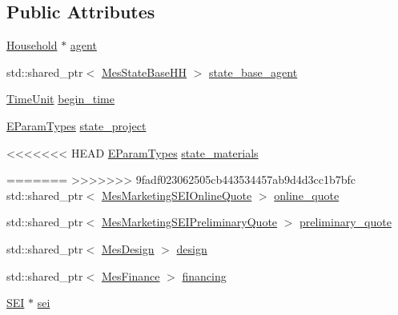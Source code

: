 \subsection*{Public Attributes}
\begin{DoxyCompactItemize}
\item 
\hyperlink{classsolar__core_1_1_household}{Household} $\ast$ \hyperlink{classsolar__core_1_1_p_v_project_a20e8115154979d2f856f1acceb6bb2b1}{agent}
\item 
std\+::shared\+\_\+ptr$<$ \hyperlink{classsolar__core_1_1_mes_state_base_h_h}{Mes\+State\+Base\+H\+H} $>$ \hyperlink{classsolar__core_1_1_p_v_project_a1a3576ddac7b82f9a2d7c139af9850d2}{state\+\_\+base\+\_\+agent}
\item 
\hyperlink{namespacesolar__core_a4b5949d07259da6f8a20d12a30403e90}{Time\+Unit} \hyperlink{classsolar__core_1_1_p_v_project_a5b8869c2a2580e5183a7796580074555}{begin\+\_\+time}
\item 
\hyperlink{namespacesolar__core_aa1147341e5ef7a40d68d1bd68e149362}{E\+Param\+Types} \hyperlink{classsolar__core_1_1_p_v_project_ab25a22c1202f2314a55dc9a759922183}{state\+\_\+project}
\item 
<<<<<<< HEAD
\hyperlink{namespacesolar__core_aa1147341e5ef7a40d68d1bd68e149362}{E\+Param\+Types} \hyperlink{classsolar__core_1_1_p_v_project_aaac22e629b55f970a4ad43b1fcd756d1}{state\+\_\+materials}
\item 
=======
>>>>>>> 9fadf023062505cb443534457ab9d4d3cc1b7bfc
std\+::shared\+\_\+ptr$<$ \hyperlink{classsolar__core_1_1_mes_marketing_s_e_i_online_quote}{Mes\+Marketing\+S\+E\+I\+Online\+Quote} $>$ \hyperlink{classsolar__core_1_1_p_v_project_ae7998ae898c0230fbde18818cfd088a1}{online\+\_\+quote}
\item 
std\+::shared\+\_\+ptr$<$ \hyperlink{classsolar__core_1_1_mes_marketing_s_e_i_preliminary_quote}{Mes\+Marketing\+S\+E\+I\+Preliminary\+Quote} $>$ \hyperlink{classsolar__core_1_1_p_v_project_a5d75e9dfe664f7307b0dc24c1f00d8a9}{preliminary\+\_\+quote}
\item 
std\+::shared\+\_\+ptr$<$ \hyperlink{classsolar__core_1_1_mes_design}{Mes\+Design} $>$ \hyperlink{classsolar__core_1_1_p_v_project_a0e3e8228c8129ccd07e44503ef8577a8}{design}
\item 
std\+::shared\+\_\+ptr$<$ \hyperlink{classsolar__core_1_1_mes_finance}{Mes\+Finance} $>$ \hyperlink{classsolar__core_1_1_p_v_project_adf809769d8d38859f2f766fb5332b946}{financing}
\item 
\hyperlink{classsolar__core_1_1_s_e_i}{S\+E\+I} $\ast$ \hyperlink{classsolar__core_1_1_p_v_project_af8fdd82137a3b0aa277ae6b9663fcb33}{sei}

\end{DoxyCompactItemize}
